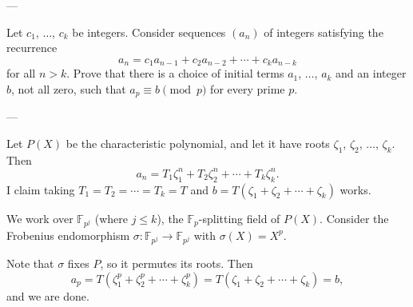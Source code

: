 
---

Let $c_1$, $\ldots$, $c_k$ be integers. Consider sequences $(a_n)$ of integers satisfying the recurrence \[a_n=c_1a_{n-1}+c_2a_{n-2}+\cdots+c_ka_{n-k}\]
for all $n>k$. Prove that there is a choice of initial terms $a_1$, $\ldots$, $a_k$ and an integer $b$, not all zero, such that $a_p\equiv b\pmod p$ for every prime $p$.

---

Let $P(X)$ be the characteristic polynomial, and let it have roots $\zeta_1$, $\zeta_2$, $\ldots$, $\zeta_k$. Then \[a_n=T_1\zeta_1^n+T_2\zeta_2^n+\cdots+T_k\zeta_k^n.\]
I claim taking $T_1=T_2=\cdots=T_k=T$ and $b=T(\zeta_1+\zeta_2+\cdots+\zeta_k)$ works.

We work over $\mathbb F_{p^j}$ (where $j\le k$), the $\mathbb F_p$-splitting field of $P(X)$. Consider the Frobenius endomorphism $\sigma:\mathbb F_{p^j}\to\mathbb F_{p^j}$ with $\sigma(X)=X^p$.

Note that $\sigma$ fixes $P$, so it permutes its roots. Then \[a_p=T\left(\zeta_1^p+\zeta_2^p+\cdots+\zeta_k^p\right)=T(\zeta_1+\zeta_2+\cdots+\zeta_k)=b,\]
and we are done.


